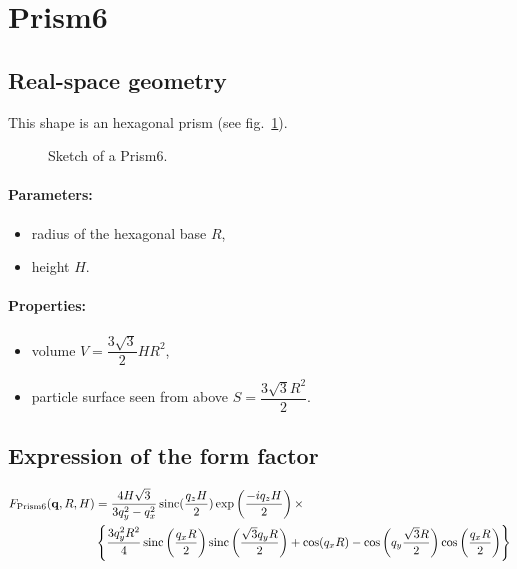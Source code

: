 \newpage{\cleardoublepage}
\section{Prism6} 

\subsection{Real-space geometry}
This shape is an hexagonal prism (see fig.~\ref{prism6}).

\begin{figure}[ht]
\begin{center}
\caption{Sketch of a Prism6.}
\end{center}
\label{prism6}
\end{figure}


\paragraph{Parameters:}
\begin{itemize}
\item radius of the hexagonal base $R$,
\item height $H$.
\end{itemize}

\paragraph{Properties:}
\begin{itemize}
\item volume $V = \dfrac{3\sqrt{3}}{2}H R^2$,
\item particle surface seen from above $S =\dfrac{3\sqrt{3}R^2}{2}$.
\end{itemize}

\subsection{Expression of the form factor}
\begin{align*}
F_{\rm{Prism6}}(\mathbf{q}, R, H) &= \frac{4H\sqrt{3}}{3q_y^2 - q_x^2}
\operatorname{sinc}(\frac{q_z H}{2}) \exp\left(\frac{-i q_z H}{2}\right)\times\\
&\left\{\frac{3q_y^2R^2}{4} \operatorname{sinc}\left(\frac{q_x
  R}{2}\right)\operatorname{sinc}\left(\frac{\sqrt{3}q_yR }{2}\right)+ \cos(q_x R)-\cos\left(q_y
\frac{\sqrt{3}R}{2}\right) \cos\left(\frac{q_x R}{2}\right)\right\}
\end{align*}

